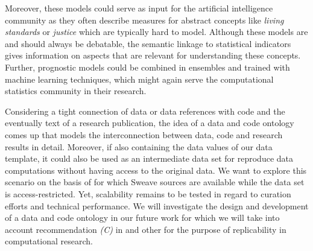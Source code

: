\documentclass{acm_proc_article-sp}
\begin{document}
Moreover, these models could serve as input for the artificial intelligence community as they often describe measures for abstract concepts like \textit{living standards} or \textit{justice} which are typically hard to model.
Although these models are and should always be debatable, the semantic linkage to statistical indicators gives information on aspects that are relevant for understanding these concepts.
Further, prognostic models could be combined in ensembles and trained with machine learning techniques, which might again serve the computational statistics community in their research.


Considering a tight connection of data or data references with code and the eventually text of a research publication, the idea of a data and code ontology comes up that models the interconnection between data, code and research results in detail. 
Moreover, if also containing the data values of our data template, it could also be used as an intermediate data set for reproduce data computations without having access to the original data.
We want to explore this scenario on the basis of \cite{arai2011fragile} for which Sweave sources are available while the data set is access-restricted.
Yet, scalability remains to be tested in regard to curation efforts and technical performance.
We will investigate the design and development of a data and code ontology in our future work for which we will take into account recommendation \textit{(C)} in \cite{RePEc_ejw_journl_v_4_y_2007_i_3_p_326_337} and other
%
%
\cite{KoenkerZeileis2009} 
%
\cite{baiocchi2007reproducible}
%
\cite{gentleman2007statistical}
%
\cite{rahmandad2012reporting}
for the purpose of replicability in computational research.


%
%
%
\end{document}
